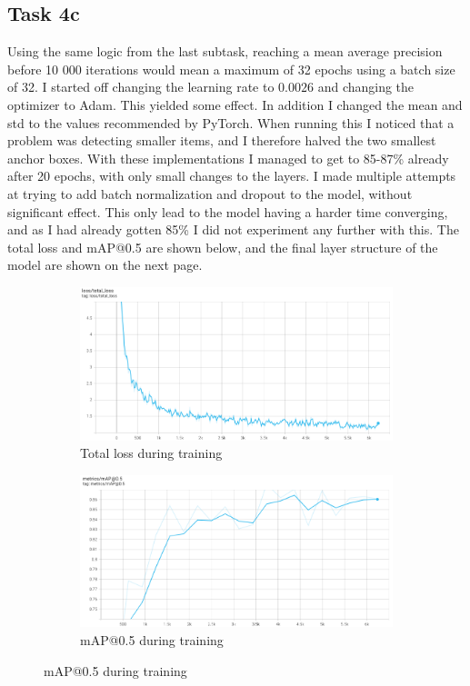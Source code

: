 \clearpage
\subsection*{Task 4c}
Using the same logic from the last subtask, reaching a mean average precision before 10 000 iterations would mean a maximum of 32 epochs using a batch size of 32.
I started off changing the learning rate to $0.0026$ and changing the optimizer to Adam. This yielded some effect. 
In addition I changed the mean and std to the values recommended by PyTorch.
When running this I noticed that a problem was detecting smaller items, and I therefore halved the two smallest anchor boxes.
With these implementations I managed to get to 85-87\% already after 20 epochs, with only small changes to the layers.
I made multiple attempts at trying to add batch normalization and dropout to the model, without significant effect.
This only lead to the model having a harder time converging, and as I had already gotten 85\% I did not experiment any further with this.
The total loss and mAP@0.5 are shown below, and the final layer structure of the model are shown on the next page.

\begin{figure}[h!]
    \centering
    \begin{subfigure}[b]{\textwidth}
        \centering
        \includegraphics[width=\textwidth]{Images/task4c_total_loss.png}
        \caption*{Total loss during training}
    \end{subfigure}
    \hfill
    \begin{subfigure}[b]{\textwidth}
        \centering
        \includegraphics[width=\textwidth]{Images/task4c_map05.png}
        \caption*{mAP@0.5 during training}
    \end{subfigure}
\end{figure}

